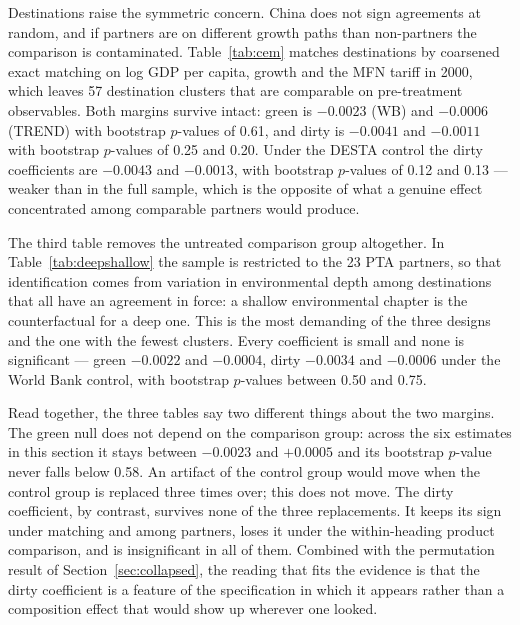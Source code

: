 \documentclass[11pt]{article}
\begin{document}
Destinations raise the symmetric concern. China does not sign agreements at random, and if partners
are on different growth paths than non-partners the comparison is contaminated. Table~\ref{tab:cem}
matches destinations by coarsened exact matching on log GDP per capita, growth and the MFN tariff in
2000, which leaves 57 destination clusters that are comparable on pre-treatment observables. Both
margins survive intact: green is $-0.0023$ (WB) and $-0.0006$ (TREND) with bootstrap $p$-values of
0.61, and dirty is $-0.0041$ and $-0.0011$ with bootstrap $p$-values of 0.25 and 0.20. Under the DESTA
control the dirty coefficients are $-0.0043$ and $-0.0013$, with bootstrap $p$-values of 0.12 and 0.13
--- weaker than in the full sample, which is the opposite of what a genuine effect concentrated among
comparable partners would produce.

The third table removes the untreated comparison group altogether. In Table~\ref{tab:deepshallow} the
sample is restricted to the 23 PTA partners, so that identification comes from variation in
environmental depth among destinations that all have an agreement in force: a shallow environmental
chapter is the counterfactual for a deep one. This is the most demanding of the three designs and the
one with the fewest clusters. Every coefficient is small and none is significant --- green $-0.0022$
and $-0.0004$, dirty $-0.0034$ and $-0.0006$ under the World Bank control, with bootstrap $p$-values
between 0.50 and 0.75.

Read together, the three tables say two different things about the two margins. The green null does
not depend on the comparison group: across the six estimates in this section it stays between $-0.0023$
and $+0.0005$ and its bootstrap $p$-value never falls below 0.58. An artifact of the control group
would move when the control group is replaced three times over; this does not move. The dirty
coefficient, by contrast, survives none of the three replacements. It keeps its sign under matching
and among partners, loses it under the within-heading product comparison, and is insignificant in all
of them. Combined with the permutation result of Section~\ref{sec:collapsed}, the reading that fits
the evidence is that the dirty coefficient is a feature of the specification in which it appears
rather than a composition effect that would show up wherever one looked.






\end{document}
